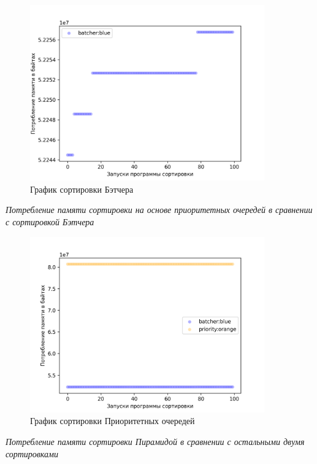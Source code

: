 \begin{figure}[H]
    \centering
    \includegraphics[width=0.9\textwidth]{./plots/batcher_memory.png}
    \caption{График сортировки Бэтчера}
\end{figure}


\textit{Потребление памяти сортировки на основе приоритетных очередей в сравнении с сортировкой Бэтчера}

\begin{figure}[H]
    \centering
    \includegraphics[width=0.9\textwidth]{./plots/priority_memory.png}
    \caption{График сортировки Приоритетных очередей}
\end{figure}



\textit{Потребление памяти сортировки Пирамидой в сравнении с остальными двумя сортировками}


